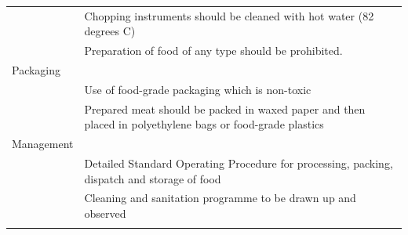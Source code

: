 \documentclass[a4paper, 12pt]{article}
\newcommand\tabitem{\makebox[1em][r]{\textbullet~}}
\begin{document}
\begin{longtable}{>{\raggedright}p{6.5cm}>{\raggedright\arraybackslash}p{8.5cm}}
	&	\newline{}\tabitem Chopping instruments should be cleaned with hot water (82 degrees C)\\
	&	\newline{}\tabitem Preparation of food of any type should be prohibited. \\
    \midrule
    Packaging	&	 \\
    \midrule
          & \tabitem Use of food-grade packaging which is non-toxic\\
	&	\newline{} \tabitem Prepared meat should be packed in waxed paper and then placed in polyethylene bags or food-grade plastics \\
    \midrule
    Management 	&	 \\
    \midrule
          &	\tabitem Detailed Standard Operating Procedure for processing, packing, dispatch and storage of food\\
	&	\newline{} \tabitem Cleaning and sanitation programme to be drawn up and observed \\
\bottomrule

  \label{tab:addlabel}%
\end{longtable}%
\end{document}
